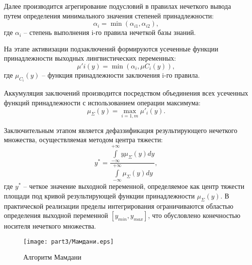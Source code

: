 Далее производится агрегирование подусловий в правилах нечеткого вывода путем
определения минимального значения степеней принадлежности:
\begin{equation}
	\alpha_i = \min(\alpha_{i1}, \alpha_{i2}),
\end{equation}
где $\alpha_i$ -- степень выполнения i-го правила нечеткой базы знаний.

На этапе активизации подзаключений формируются усеченные
функции принадлежности выходных лингвистических переменных:
\begin{equation}
	\mu'i(y) = \min(\alpha_i, \mu{C_i}(y)),
\end{equation}
где $\mu_{C_i}(y)$ -- функция принадлежности заключения i-го правила.

Аккумуляция заключений производится посредством объединения всех
усеченных функций принадлежности с использованием операции максимума:
\begin{equation}
	\mu_\Sigma(y) = \max_{i=1,m}\mu'_i(y).
\end{equation}

Заключительным этапом является дефаззификация результирующего
нечеткого множества, осуществляемая методом центра тяжести:
\begin{equation}
	y^* = \frac{\displaystyle\int\limits_{-\infty}^{+\infty} y\mu_\Sigma(y)dy}{\displaystyle\int\limits_{-\infty}^{+\infty} \mu_\Sigma(y)dy},
\end{equation}
где $y^*$ -- четкое значение выходной переменной, определяемое как центр тяжести площади под кривой
результирующей функции принадлежности $\mu_\Sigma(y)$.
В практической реализации пределы интегрирования ограничиваются областью определения
выходной переменной $[y_{min}, y_{max}]$, что обусловлено конечностью носителя нечеткого множества.

\begin{figure}[ht]
	\centering
	\texttt{[image: part3/Мамдани.eps]}
	\caption{Алгоритм Мамдани}
	\label{fig:fuzzy_inference}
\end{figure}

